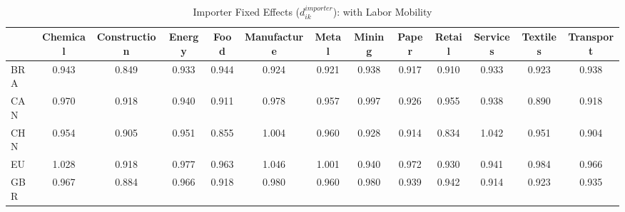 \begin{table}[htbp]
\centering
\caption{Importer Fixed Effects ($d_{ik}^{importer}$): with Labor Mobility} 
\label{tab:importer_effects}
\begin{tabular}{lcccccccccccc}
  \hline
 & Chemical & Construction & Energy & Food & Manufacture & Metal & Mining & Paper & Retail & Services & Textiles & Transport \\ 
  \hline
BRA & \textcolor[RGB]{113,73,142}{0.943} & \textcolor[RGB]{244,158,11}{0.849} & \textcolor[RGB]{142,92,113}{0.933} & \textcolor[RGB]{110,72,144}{0.944} & \textcolor[RGB]{170,110,85}{0.924} & \textcolor[RGB]{178,115,76}{0.921} & \textcolor[RGB]{132,85,123}{0.938} & \textcolor[RGB]{193,125,62}{0.917} & \textcolor[RGB]{208,135,47}{0.910} & \textcolor[RGB]{144,94,110}{0.933} & \textcolor[RGB]{174,113,81}{0.923} & \textcolor[RGB]{128,82,128}{0.938} \\ 
  CAN & \textcolor[RGB]{53,34,202}{0.970} & \textcolor[RGB]{189,122,66}{0.918} & \textcolor[RGB]{119,77,136}{0.940} & \textcolor[RGB]{204,132,51}{0.911} & \textcolor[RGB]{42,27,212}{0.978} & \textcolor[RGB]{79,51,176}{0.957} & \textcolor[RGB]{23,15,232}{0.997} & \textcolor[RGB]{166,107,89}{0.926} & \textcolor[RGB]{81,52,174}{0.955} & \textcolor[RGB]{130,84,125}{0.938} & \textcolor[RGB]{223,144,32}{0.890} & \textcolor[RGB]{191,124,64}{0.918} \\ 
  CHN & \textcolor[RGB]{85,55,170}{0.954} & \textcolor[RGB]{217,140,38}{0.905} & \textcolor[RGB]{91,59,164}{0.951} & \textcolor[RGB]{242,157,13}{0.855} & \textcolor[RGB]{17,11,238}{1.004} & \textcolor[RGB]{72,47,183}{0.960} & \textcolor[RGB]{162,104,94}{0.928} & \textcolor[RGB]{198,128,57}{0.914} & \textcolor[RGB]{251,162,4}{0.834} & \textcolor[RGB]{4,3,251}{1.042} & \textcolor[RGB]{89,58,166}{0.951} & \textcolor[RGB]{221,143,34}{0.904} \\ 
  EU & \textcolor[RGB]{8,5,246}{1.028} & \textcolor[RGB]{187,121,68}{0.918} & \textcolor[RGB]{45,29,210}{0.977} & \textcolor[RGB]{70,45,185}{0.963} & \textcolor[RGB]{2,1,253}{1.046} & \textcolor[RGB]{21,14,234}{1.001} & \textcolor[RGB]{121,78,134}{0.940} & \textcolor[RGB]{49,32,206}{0.972} & \textcolor[RGB]{153,99,102}{0.930} & \textcolor[RGB]{117,76,138}{0.941} & \textcolor[RGB]{32,21,223}{0.984} & \textcolor[RGB]{68,44,187}{0.966} \\ 
  GBR & \textcolor[RGB]{57,37,198}{0.967} & \textcolor[RGB]{225,146,30}{0.884} & \textcolor[RGB]{62,40,193}{0.966} & \textcolor[RGB]{183,118,72}{0.918} & \textcolor[RGB]{38,25,217}{0.980} & \textcolor[RGB]{77,50,178}{0.960} & \textcolor[RGB]{40,26,215}{0.980} & \textcolor[RGB]{125,81,130}{0.939} & \textcolor[RGB]{115,74,140}{0.942} & \textcolor[RGB]{202,131,53}{0.914} & \textcolor[RGB]{172,111,83}{0.923} & \textcolor[RGB]{136,88,119}{0.935} \\ 

\end{tabular}
\end{table}
